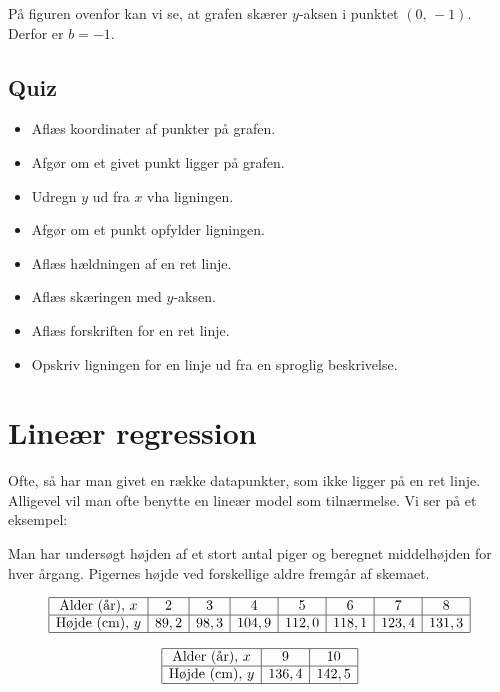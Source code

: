 \documentclass[12pt,oneside,a4paper]{article}
\begin{document}
På figuren ovenfor kan vi se, at grafen skærer $y$-aksen i punktet $(0,\,-1)$. Derfor
er $b=-1$.

\subsection{Quiz}
\begin{itemize}
    \item Aflæs koordinater af punkter på grafen.
    \item Afgør om et givet punkt ligger på grafen.
    \item Udregn $y$ ud fra $x$ vha ligningen.
    \item Afgør om et punkt opfylder ligningen.
    \item Aflæs hældningen af en ret linje.
    \item Aflæs skæringen med $y$-aksen.
    \item Aflæs forskriften for en ret linje.
    \item Opskriv ligningen for en linje ud fra en sproglig beskrivelse.
\end{itemize}



\section{Lineær regression}
Ofte, så har man givet en række datapunkter, som ikke ligger på en ret linje. Alligevel
vil man ofte benytte en lineær model som tilnærmelse. Vi ser på et eksempel:

Man har undersøgt højden af et stort antal piger og beregnet middel\-høj\-den for
hver årgang. Pigernes højde ved forskellige aldre fremgår af skemaet.

\[
\begin{array}{|c|c|c|c|c|c|c|c|}
    \hline
    \mbox{Alder (år)},\, x &  2 &  3 &  4 &  5 &  6 &  7 &  8 \\
    \hline
    \mbox{Højde (cm)},\, y &  89,2 &   98,3 &   104,9 &  112,0 &  118,1 &  123,4 &  131,3 \\
    \hline
\end{array}
\]

\[
\begin{array}{|c|c|c|c|c|c|c|}
    \hline
    \mbox{Alder (år)},\, x  & 9  & 10 \\
    \hline
    \mbox{Højde (cm)},\, y  & 136,4 &  142,5 \\
    \hline
\end{array}
\]
\end{document}
